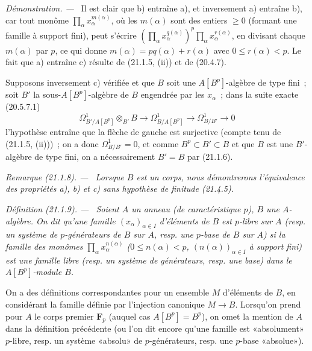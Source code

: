 \documentclass[10pt,oneside]{book}
\makeatletter
\newcommand{\setmanualcurrentlabel}[1]{\def\@currentlabel{#1}}
\newenvironment{definition}[1][]{%
  \setmanualcurrentlabel{#1}\par\medskip\noindent\itshape Définition (#1). ---\ }{\par}
\newenvironment{remark}[1][]{%
  \setmanualcurrentlabel{#1}\par\medskip\noindent\itshape Remarque (#1). ---\ }{\par}
\newenvironment{proof}{%
  \par\medskip\noindent\textit{Démonstration. ---\ }}{\par}
\makeatother
\begin{document}
\begin{proof}
Il est clair que b) entraîne a), et inversement a) entraîne b), car tout
monôme $\prod_\alpha x_\alpha^{m(\alpha)}$, où les $m(\alpha)$ sont des
entiers $\geq0$ (formant une famille à support fini), peut s'écrire
$(\prod_\alpha x_\alpha^{q(\alpha)})^p\prod_\alpha x_\alpha^{r(\alpha)}$,
en divisant chaque $m(\alpha)$ par $p$, ce qui donne
$m(\alpha)=p q(\alpha)+r(\alpha)$ avec $0\leq r(\alpha)<p$.
Le fait que a) entraîne c) résulte de (21.1.5, (ii)) et de (20.4.7).

Supposons inversement c) vérifiée et que $B$ soit une $A[B^p]$-algèbre de
type fini~; soit $B'$ la sous-$A[B^p]$-algèbre de $B$ engendrée par les
$x_\alpha$~; dans la suite exacte (20.5.7.1)
\[
\Omega^1_{B'/A[B^p]}\otimes_{B'}B\longrightarrow
\Omega^1_{B/A[B^p]}\longrightarrow\Omega^1_{B/B'}\longrightarrow0
\]
l'hypothèse entraîne que la flèche de gauche est surjective (compte tenu de
(21.1.5, (ii)))~; on a donc $\Omega^1_{B/B'}=0$, et comme
$B^p\subset B'\subset B$ et que $B$ est une $B'$-algèbre de type fini,
on a nécessairement $B'=B$ par (21.1.6).
\end{proof}

\begin{remark}[21.1.8]
\label{0.21.1.8-fr}
Lorsque $B$ est un corps, nous démontrerons l'équivalence des propriétés a),
b) et c) sans hypothèse de finitude (21.4.5).
\end{remark}

\begin{definition}[21.1.9]
\label{0.21.1.9-fr}
Soient $A$ un anneau (de caractéristique $p$), $B$ une $A$-algèbre. On dit
qu'une famille $(x_\alpha)_{\alpha\in I}$ d'éléments de $B$ est $p$-libre sur
$A$ (resp. un système de $p$-générateurs de $B$ sur $A$, resp. une $p$-base
de $B$ sur $A$) si la famille des monômes
$\prod_\alpha x_\alpha^{n(\alpha)}$ ($0\leq n(\alpha)<p$,
$(n(\alpha))_{\alpha\in I}$ à support fini) est une famille libre (resp. un
système de générateurs, resp. une base) dans le $A[B^p]$-module $B$.
\end{definition}

On a des définitions correspondantes pour un ensemble $M$ d'éléments de $B$,
en considérant la famille définie par l'injection canonique $M\to B$.
Lorsqu'on prend pour $A$ le corps premier $\mathbf F_p$ (auquel cas
$A[B^p]=B^p$), on omet la mention de $A$ dans la définition précédente (ou
l'on dit encore qu'une famille est «absolument» $p$-libre, resp. un système
«absolu» de $p$-générateurs, resp. une $p$-base «absolue»).
\end{document}
